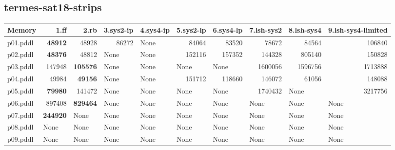\documentclass{article}
\begin{document}
\hypertarget{memory-termes-sat18-strips}{}
\subsection*{termes-sat18-strips}

\begin{tabular}{@{}lrrrrrrrrr@{}}
Memory & 1.ff & 2.rb & 3.sys2-ip & 4.sys4-ip & 5.sys2-lp & 6.sys4-lp & 7.lsh-sys2 & 8.lsh-sys4 & 9.lsh-sys4-limited \\
\midrule
p01.pddl & \textbf{48912} & 48928 & 86272 & \multicolumn{1}{|l|}{None} & 84064 & 83520 & 78672 & 84564 & 106840 \\
p02.pddl & \textbf{48376} & 48812 & \multicolumn{1}{|l|}{None} & \multicolumn{1}{|l|}{None} & 152116 & 157352 & 144328 & 805140 & 150828 \\
p03.pddl & 147948 & \textbf{105576} & \multicolumn{1}{|l|}{None} & \multicolumn{1}{|l|}{None} & \multicolumn{1}{|l|}{None} & \multicolumn{1}{|l|}{None} & 1600056 & 1596756 & 1713888 \\
p04.pddl & 49984 & \textbf{49156} & \multicolumn{1}{|l|}{None} & \multicolumn{1}{|l|}{None} & 151712 & 118660 & 146072 & 61056 & 148088 \\
p05.pddl & \textbf{79980} & 141472 & \multicolumn{1}{|l|}{None} & \multicolumn{1}{|l|}{None} & \multicolumn{1}{|l|}{None} & \multicolumn{1}{|l|}{None} & 1740432 & \multicolumn{1}{|l|}{None} & 3217756 \\
p06.pddl & 897408 & \textbf{829464} & \multicolumn{1}{|l|}{None} & \multicolumn{1}{|l|}{None} & \multicolumn{1}{|l|}{None} & \multicolumn{1}{|l|}{None} & \multicolumn{1}{|l|}{None} & \multicolumn{1}{|l|}{None} & \multicolumn{1}{|l|}{None} \\
p07.pddl & \textbf{244920} & \multicolumn{1}{|l|}{None} & \multicolumn{1}{|l|}{None} & \multicolumn{1}{|l|}{None} & \multicolumn{1}{|l|}{None} & \multicolumn{1}{|l|}{None} & \multicolumn{1}{|l|}{None} & \multicolumn{1}{|l|}{None} & \multicolumn{1}{|l|}{None} \\
p08.pddl & \multicolumn{1}{|l|}{None} & \multicolumn{1}{|l|}{None} & \multicolumn{1}{|l|}{None} & \multicolumn{1}{|l|}{None} & \multicolumn{1}{|l|}{None} & \multicolumn{1}{|l|}{None} & \multicolumn{1}{|l|}{None} & \multicolumn{1}{|l|}{None} & \multicolumn{1}{|l|}{None} \\
p09.pddl & \multicolumn{1}{|l|}{None} & \multicolumn{1}{|l|}{None} & \multicolumn{1}{|l|}{None} & \multicolumn{1}{|l|}{None} & \multicolumn{1}{|l|}{None} & \multicolumn{1}{|l|}{None} & \multicolumn{1}{|l|}{None} & \multicolumn{1}{|l|}{None} & \multicolumn{1}{|l|}{None} \\

\end{tabular}
\end{document}
